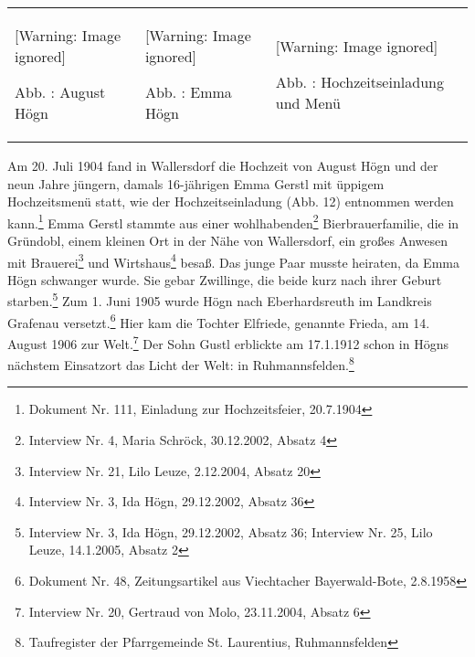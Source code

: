 \documentclass[a4paper]{article}
\newcommand\textstyleFootnoteSymbol[1]{\textsuperscript{#1}}
\newcounter{Abb}
\renewcommand\theAbb{\arabic{Abb}}
\begin{document}
\begin{flushleft}
\tablefirsthead{}
\tablehead{}
\tabletail{}
\tablelasttail{}
\begin{supertabular}{m{4.3650002cm}m{4.894cm}m{6.556cm}}
  [Warning: Image ignored] %
 
Abb. \stepcounter{Abb}{\theAbb}: August Högn &
  [Warning: Image ignored] %
 
Abb. \stepcounter{Abb}{\theAbb}: Emma Högn &
  [Warning: Image ignored] %
 
\label{bkm:Ref100297575}Abb. \stepcounter{Abb}{\theAbb}:
Hochzeitseinladung und Menü\\
\end{supertabular}
\end{flushleft}
Am 20. Juli 1904 fand in Wallersdorf die Hochzeit von August Högn und
der neun Jahre jüngern, damals 16-jährigen Emma Gerstl mit üppigem
Hochzeitsmenü statt, wie der Hochzeitseinladung (Abb. 12) entnommen
werden kann.\footnote{ Dokument Nr. 111, Einladung zur Hochzeitsfeier,
20.7.1904} Emma Gerstl stammte aus einer wohlhabenden\footnote{
Interview Nr. 4, Maria Schröck, 30.12.2002, Absatz 4}
Bierbrauerfamilie,\textstyleFootnoteSymbol{ }die in Gründobl, einem
kleinen Ort in der Nähe von Wallersdorf, ein großes Anwesen mit
Brauerei\footnote{ Interview Nr. 21, Lilo Leuze, 2.12.2004, Absatz 20}
und Wirtshaus\footnote{ Interview Nr. 3, Ida Högn, 29.12.2002, Absatz
36} besaß. Das junge Paar musste heiraten, da Emma Högn schwanger
wurde. Sie gebar Zwillinge, die beide kurz nach ihrer Geburt
starben.\footnote{ Interview Nr. 3, Ida Högn, 29.12.2002, Absatz 36;
Interview Nr. 25, Lilo Leuze, 14.1.2005, Absatz 2} Zum 1. Juni 1905
wurde Högn nach Eberhardsreuth im Landkreis Grafenau
versetzt.\footnote{ Dokument Nr. 48, Zeitungsartikel aus Viechtacher
Bayerwald-Bote, 2.8.1958} Hier kam die Tochter Elfriede, genannte
Frieda, am 14. August 1906 zur Welt.\footnote{ Interview Nr. 20,
Gertraud von Molo, 23.11.2004, Absatz 6} Der Sohn Gustl erblickte am
17.1.1912 schon in Högns nächstem Einsatzort das Licht der Welt: in
Ruhmannsfelden.\footnote{ Taufregister der Pfarrgemeinde St.
Laurentius, Ruhmannsfelden}
\end{document}
